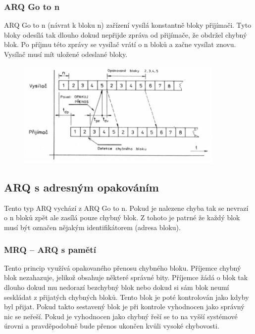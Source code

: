 \subsubsection{ARQ Go to n}

ARQ Go to n (návrat k bloku n) zařízení vysílá konstantně bloky přijímači.
Tyto bloky odesílá tak dlouho dokud nepřijde zpráva od přijímače, že obdržel chybný blok.
Po příjmu této zprávy se vysílač vrátí o n bloků a začne vysílat znovu.
Vysílač musí mít uložené odeslané bloky.

\begin{figure}[h]
    \centering
    \includegraphics[width=0.9\textwidth]{images/031.png}
\end{figure}

\subsection{ARQ s adresným opakováním}

Tento typ ARQ vychází z ARQ Go to n.
Pokud je nalezene chyba tak se nevrazí o n bloků zpět ale zasílá pouze chybný blok.
Z tohoto je patrné že každý blok musí být označen nějakým identifikátorem (adresa bloku).

\subsubsection{MRQ -- ARQ s pamětí}

Tento princip využívá opakovaného přenosu chybného bloku.
Příjemce chybný blok nezahazuje, jelikož obsahuje některé správné bity.
Příjemce žádá o blok tak dlouho dokud mu nedorazí bezchybný blok nebo dokud si sám blok neumí seskládat z přijatých chybných bloků.
Tento blok je poté kontrolován jako kdyby byl přijat.
Pokud takto sestavený blok je při kontrole vyhodnocen jako správný  nic se neřeší.
Pokud je vyhodnocen jako chybný řeší se to na vyšší systémové úrovni a pravděpodobně bude přenos ukončen kvůli vysoké chybovosti.


